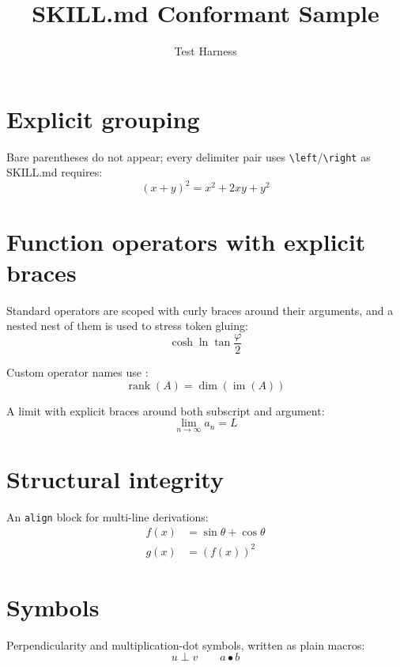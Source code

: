 \documentclass{article}
\title{SKILL.md Conformant Sample}
\author{Test Harness}
\begin{document}
\maketitle

\section{Explicit grouping}
Bare parentheses do not appear; every delimiter pair uses
\verb|\left|/\verb|\right| as SKILL.md requires:
\begin{equation}
\left( x + y \right)^{2} = x^{2} + 2xy + y^{2}
\end{equation}

\section{Function operators with explicit braces}
Standard operators are scoped with curly braces around their arguments,
and a nested nest of them is used to stress token gluing:
\begin{equation}
\cosh{\ln{\tan{\frac{\varphi}{2}}}}
\end{equation}

Custom operator names use \operatorname{}:
\begin{equation}
\operatorname{rank}(A) = \operatorname{dim}\left( \operatorname{im}\left( A \right) \right)
\end{equation}

A limit with explicit braces around both subscript and argument:
\begin{equation}
\lim_{n \to \infty}{a_{n}} = L
\end{equation}

\section{Structural integrity}
An \verb|align| block for multi-line derivations:
\begin{align}
f(x) &= \sin{\theta} + \cos{\theta} \\
g(x) &= \left( f(x) \right)^{2}
\end{align}

\section{Symbols}
Perpendicularity and multiplication-dot symbols, written as plain macros:
\begin{equation}
u \perp v \qquad a \bullet b
\end{equation}
\end{document}
